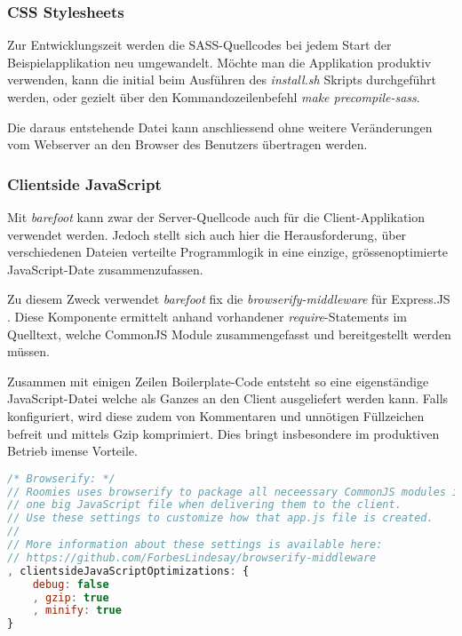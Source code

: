 \subsubsection*{CSS Stylesheets}
Zur Entwicklungszeit werden die SASS-Quellcodes bei jedem Start der Beispielapplikation neu umgewandelt. Möchte man die Applikation produktiv verwenden, kann die initial beim Ausführen des \emph{install.sh} Skripts durchgeführt werden, oder gezielt über den Kommandozeilenbefehl \emph{make precompile-sass}.

Die daraus entstehende Datei kann anschliessend ohne weitere Veränderungen vom Webserver an den Browser des Benutzers übertragen werden.

\subsubsection*{Clientside JavaScript}
Mit \emph{barefoot} \cite{Barefoot} kann zwar der Server-Quellcode auch für die Client-Applikation verwendet werden. Jedoch stellt sich auch hier die Herausforderung, über verschiedenen Dateien verteilte Programmlogik in eine einzige, grössenoptimierte JavaScript-Date zusammenzufassen.

Zu diesem Zweck verwendet \emph{barefoot} fix die \emph{browserify-middleware} für Express.JS \cite{browserifymiddleware}. Diese Komponente ermittelt anhand vorhandener \emph{require}-Statements im Quelltext, welche CommonJS Module \cite{commonjsmodules} zusammengefasst und bereitgestellt werden müssen.

Zusammen mit einigen Zeilen \gls{Boilerplate}-Code entsteht so eine eigenständige JavaScript-Datei welche als Ganzes an den Client ausgeliefert werden kann. Falls konfiguriert, wird diese zudem von Kommentaren und unnötigen Füllzeichen befreit und mittels Gzip \cite{gzip} komprimiert. Dies bringt insbesondere im produktiven Betrieb imense Vorteile.

\begin{lstlisting}[language=JavaScript, firstline=95, caption=Konfiguration der browserify Middleware \cite{RoomiesExampleConfig}, label=lst:configBrowserifyMiddleware]
/* Browserify: */
// Roomies uses browserify to package all neceessary CommonJS modules into
// one big JavaScript file when delivering them to the client.
// Use these settings to customize how that app.js file is created.
//
// More information about these settings is available here:
// https://github.com/ForbesLindesay/browserify-middleware
, clientsideJavaScriptOptimizations: {
	debug: false
	, gzip: true
	, minify: true
}
\end{lstlisting}


